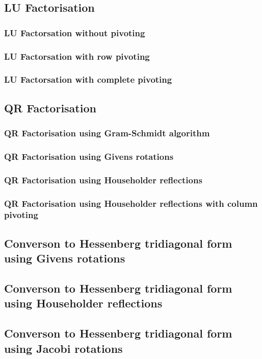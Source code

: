 \subsection{LU Factorisation}

\subsubsection{LU Factorsation without pivoting}
\subsubsection{LU Factorsation with row pivoting}
\subsubsection{LU Factorsation with complete pivoting}

\subsection{QR Factorisation}

\subsubsection{QR Factorisation using Gram-Schmidt algorithm}
\subsubsection{QR Factorisation using Givens rotations}
\subsubsection{QR Factorisation using Householder reflections}
\subsubsection{QR Factorisation using Householder reflections with column pivoting}

\subsection{Converson to Hessenberg tridiagonal form using Givens rotations}
\subsection{Converson to Hessenberg tridiagonal form using Householder reflections}
\subsection{Converson to Hessenberg tridiagonal form using Jacobi rotations}

